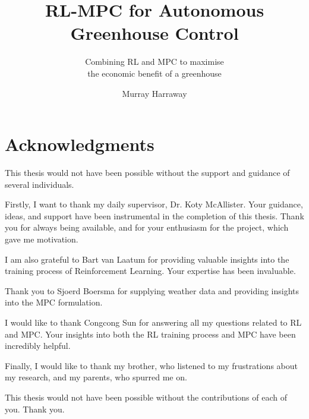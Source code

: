 \documentclass{tudelft-report}
\begin{document}
\frontmatter

\title{RL-MPC for Autonomous Greenhouse Control}
\subtitle{Combining RL and MPC to maximise  \\ the economic benefit of a greenhouse}
\author{Murray Harraway}

\subject{Systems and Control Masters Thesis} %

\makecover


% 
%


\tableofcontents


\newpage
\section*{Acknowledgments}
This thesis would not have been possible without the support and guidance of several individuals.

Firstly, I want to thank my daily supervisor, Dr. Koty McAllister. Your guidance, ideas, and support have been instrumental in the completion of this thesis. Thank you for always being available, and for your enthusiasm for the project, which gave me motivation.

I am also grateful to Bart van Laatum for providing valuable insights into the training process of Reinforcement Learning. Your expertise has been invaluable.

Thank you to Sjoerd Boersma for supplying weather data and providing insights into the MPC formulation.

I would like to thank Congcong Sun for answering all my questions related to RL and MPC. Your insights into both the RL training process and MPC have been incredibly helpful.

Finally, I would like to thank my brother, who listened to my frustrations about my research, and my parents, who spurred me on.

This thesis would not have been possible without the contributions of each of you. Thank you.

\end{document}
